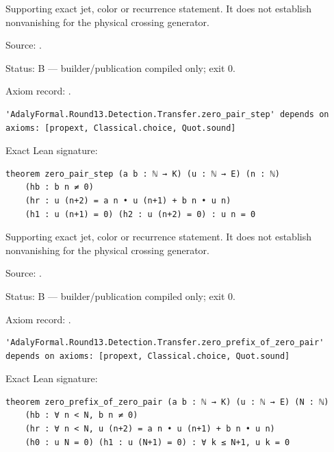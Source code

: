 \begin{theorem}[bp-506]
\label{bp-506}
\uses{}
\leanok
Supporting exact jet, color or recurrence statement. It does not establish nonvanishing for the physical crossing generator.

\par Source: \texttt{}.
\par Status: B — builder/publication compiled only; exit 0.
\par Axiom record: \texttt{}.
\begin{verbatim}
'AdalyFormal.Round13.Detection.Transfer.zero_pair_step' depends on axioms: [propext, Classical.choice, Quot.sound]
\end{verbatim}
\par Exact Lean signature:
\begin{verbatim}
theorem zero_pair_step (a b : ℕ → K) (u : ℕ → E) (n : ℕ)
    (hb : b n ≠ 0)
    (hr : u (n+2) = a n • u (n+1) + b n • u n)
    (h1 : u (n+1) = 0) (h2 : u (n+2) = 0) : u n = 0
\end{verbatim}
\end{theorem}

\begin{theorem}[bp-507]
\label{bp-507}
\leanok
Supporting exact jet, color or recurrence statement. It does not establish nonvanishing for the physical crossing generator.

\par Source: \texttt{}.
\par Status: B — builder/publication compiled only; exit 0.
\par Axiom record: \texttt{}.
\begin{verbatim}
'AdalyFormal.Round13.Detection.Transfer.zero_prefix_of_zero_pair' depends on axioms: [propext, Classical.choice, Quot.sound]
\end{verbatim}
\par Exact Lean signature:
\begin{verbatim}
theorem zero_prefix_of_zero_pair (a b : ℕ → K) (u : ℕ → E) (N : ℕ)
    (hb : ∀ n < N, b n ≠ 0)
    (hr : ∀ n < N, u (n+2) = a n • u (n+1) + b n • u n)
    (h0 : u N = 0) (h1 : u (N+1) = 0) : ∀ k ≤ N+1, u k = 0
\end{verbatim}
\end{theorem}

